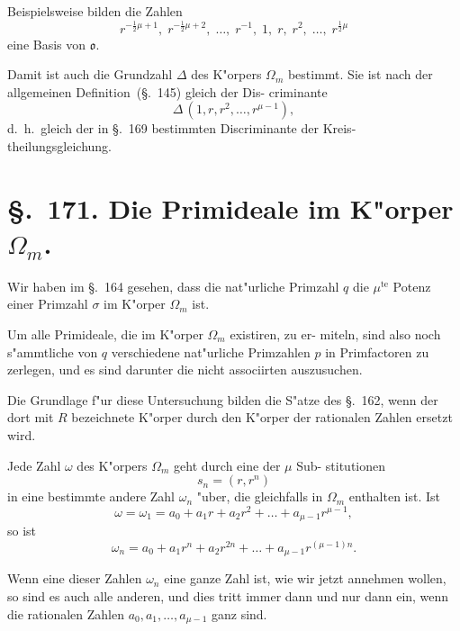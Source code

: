 \documentclass[12pt,a4paper]{article}
\theoremstyle{weber}
\begin{document}
Beispielsweise bilden die Zahlen
\begin{equation}\label{eq:s170-7}
r^{-\frac{1}{2}\mu+1},\; r^{-\frac{1}{2}\mu+2},\; \dots,\; r^{-1},\; 1,\; r,\; r^2,\; \dots,\; r^{\frac{1}{2}\mu}
\end{equation}
eine Basis von $\mathfrak{o}$.

Damit ist auch die Grundzahl $\varDelta$ des K"orpers $\varOmega_m$ bestimmt.
Sie ist nach der allgemeinen Definition~(\S.~145) gleich der Dis-
criminante
\[
\varDelta\,(1, r, r^2, \dots, r^{\mu-1}),
\]
d.~h.\ gleich der in \S.~169 bestimmten Discriminante der Kreis-
theilungsgleichung.

\newpage
\section*{\S.~171. Die Primideale im K"orper $\varOmega_m$.}

Wir haben im \S.~164 gesehen, dass die nat"urliche Primzahl $q$
die $\mu^{\mathrm{te}}$ Potenz einer Primzahl $\sigma$ im K"orper $\varOmega_m$ ist.

Um alle Primideale, die im K"orper $\varOmega_m$ existiren, zu er-
miteln, sind also noch s"ammtliche von $q$ verschiedene nat"urliche
Primzahlen $p$ in Primfactoren zu zerlegen, und es sind darunter
die nicht associirten auszusuchen.

Die Grundlage f"ur diese Untersuchung bilden die S"atze des
\S.~162, wenn der dort mit $R$ bezeichnete K"orper durch den
K"orper der rationalen Zahlen ersetzt wird.

Jede Zahl $\omega$ des K"orpers $\varOmega_m$ geht durch eine der $\mu$ Sub-
stitutionen
\[
s_n = (r, r^n)
\]
in eine bestimmte andere Zahl $\omega_n$ "uber, die gleichfalls in $\varOmega_m$
enthalten ist. Ist
\begin{equation}\label{eq:s171-1}
\omega = \omega_1 = a_0 + a_1r + a_2r^2 + \dots + a_{\mu-1}r^{\mu-1},
\end{equation}
so ist
\begin{equation}\label{eq:s171-2}
\omega_n = a_0 + a_1r^n + a_2r^{2n} + \dots + a_{\mu-1}r^{(\mu-1)n}.
\end{equation}

Wenn eine dieser Zahlen $\omega_n$ eine ganze Zahl ist, wie wir
jetzt annehmen wollen, so sind es auch alle anderen, und dies
tritt immer dann und nur dann ein, wenn die rationalen Zahlen
$a_0, a_1, \dots, a_{\mu-1}$ ganz sind.
\end{document}
